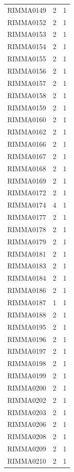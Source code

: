 \documentclass[11pt]{article}
\newcounter{rowno}
\begin{document}
\begin{scriptsize}
\begin{longtable}{>{\stepcounter{rowno}}ccc}
    RIMMA0149 & 2     & 1 \\
    RIMMA0152 & 2     & 1 \\
    RIMMA0153 & 2     & 1 \\
    RIMMA0154 & 2     & 1 \\
    RIMMA0155 & 2     & 1 \\
    RIMMA0156 & 2     & 1 \\
    RIMMA0157 & 2     & 1 \\
    RIMMA0158 & 2     & 1 \\
    RIMMA0159 & 2     & 1 \\
    RIMMA0160 & 2     & 1 \\
    RIMMA0162 & 2     & 1 \\
    RIMMA0166 & 2     & 1 \\
    RIMMA0167 & 2     & 1 \\
    RIMMA0168 & 2     & 1 \\
    RIMMA0169 & 2     & 1 \\
    RIMMA0172 & 2     & 1 \\
    RIMMA0174 & 4     & 1 \\
    RIMMA0177 & 2     & 1 \\
    RIMMA0178 & 2     & 1 \\
    RIMMA0179 & 2     & 1 \\
    RIMMA0181 & 2     & 1 \\
    RIMMA0183 & 2     & 1 \\
    RIMMA0184 & 2     & 1 \\
    RIMMA0186 & 2     & 1 \\
    RIMMA0187 & 1     & 1 \\
    RIMMA0188 & 2     & 1 \\
    RIMMA0195 & 2     & 1 \\
    RIMMA0196 & 2     & 1 \\
    RIMMA0197 & 2     & 1 \\
    RIMMA0198 & 2     & 1 \\
    RIMMA0199 & 2     & 1 \\
    RIMMA0200 & 2     & 1 \\
    RIMMA0202 & 2     & 1 \\
    RIMMA0203 & 2     & 1 \\
    RIMMA0206 & 2     & 1 \\
    RIMMA0208 & 2     & 1 \\
    RIMMA0209 & 2     & 1 \\
    RIMMA0210 & 2     & 1 \\

\end{longtable}
\end{scriptsize}
\end{document}
